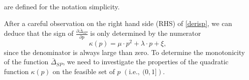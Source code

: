 \documentclass{IEEEtran}
\begin{document}
\begin{appendices}
are defined for the notation simplicity.

After a careful observation on the right hand side (RHS) of \eqref{derisp}, we can deduce that the sign of $\frac{\partial \bar{\Delta}_{SP}}{\partial p}$ is only determined by the numerator
\begin{equation}
\kappa(p) = \mu \!\cdot\! p^2+\lambda \!\cdot\! p+\xi,
\end{equation}
since the denominator is always large than zero. To determine the monotonicity of the function $\bar\Delta_{SP}$, we need to investigate the properties of the quadratic function $\kappa(p)$ on the feasible set of $p$ $\left(\mathrm{i.e.,}\  (0, 1]\right)$. 


\end{appendices}
\end{document}
